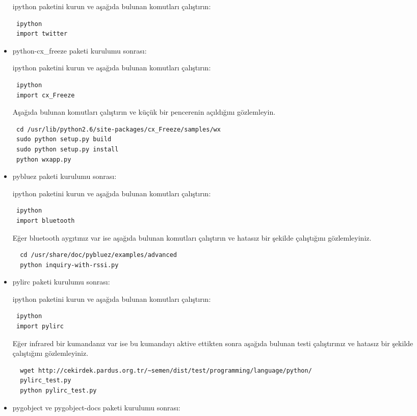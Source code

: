 \documentclass[a4paper,10pt]{article}
\begin{document}
\begin{itemize}
ipython paketini kurun ve aşağıda bulunan komutları çalıştırın:
\begin{verbatim}
 ipython
 import twitter
\end{verbatim}


\item python-cx\_freeze paketi kurulumu sonrası:

ipython paketini kurun ve aşağıda bulunan komutları çalıştırın:
\begin{verbatim}
 ipython
 import cx_Freeze
\end{verbatim}

Aşağıda bulunan komutları çalıştırın ve küçük bir pencerenin açıldığını gözlemleyin.
\begin{verbatim}
 cd /usr/lib/python2.6/site-packages/cx_Freeze/samples/wx
 sudo python setup.py build
 sudo python setup.py install
 python wxapp.py
\end{verbatim}


\item pybluez paketi kurulumu sonrası:

ipython paketini kurun ve aşağıda bulunan komutları çalıştırın:
\begin{verbatim}
 ipython
 import bluetooth
\end{verbatim}

Eğer bluetooth aygıtınız var ise aşağıda bulunan komutları çalıştırın ve hatasız bir şekilde çalıştığını gözlemleyiniz.
\begin{verbatim}
  cd /usr/share/doc/pybluez/examples/advanced
  python inquiry-with-rssi.py
\end{verbatim}



\item pylirc paketi kurulumu sonrası:

ipython paketini kurun ve aşağıda bulunan komutları çalıştırın:
\begin{verbatim}
 ipython
 import pylirc
\end{verbatim}

Eğer infrared bir kumandanız var ise bu kumandayı aktive ettikten sonra aşağıda bulunan testi çalıştırınız ve hatasız bir şekilde çalıştığını gözlemleyiniz.
\begin{verbatim}
  wget http://cekirdek.pardus.org.tr/~semen/dist/test/programming/language/python/
  pylirc_test.py
  python pylirc_test.py
\end{verbatim}


\item pygobject ve pygobject-docs paketi kurulumu sonrası:


\end{itemize}
\end{document}
